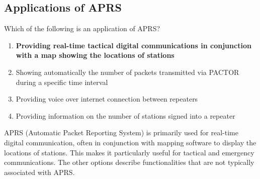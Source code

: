 \subsection{Applications of APRS}
\label{T8D05}

\begin{tcolorbox}[colback=gray!10!white,colframe=black!75!black,title=T8D05]
Which of the following is an application of APRS?
\begin{enumerate}[noitemsep]
    \item \textbf{Providing real-time tactical digital communications in conjunction with a map showing the locations of stations}
    \item Showing automatically the number of packets transmitted via PACTOR during a specific time interval
    \item Providing voice over internet connection between repeaters
    \item Providing information on the number of stations signed into a repeater
\end{enumerate}
\end{tcolorbox}

APRS (Automatic Packet Reporting System) is primarily used for real-time digital communication, often in conjunction with mapping software to display the locations of stations. This makes it particularly useful for tactical and emergency communications. The other options describe functionalities that are not typically associated with APRS.